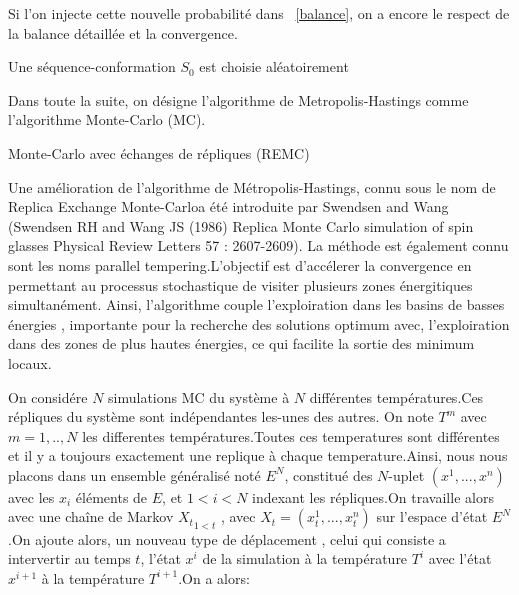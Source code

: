 Si l'on injecte cette nouvelle probabilité dans ~\ref{balance}, on a encore le respect de la balance détaillée et la convergence.


\begin{algorithm}
  Une séquence-conformation $S_0$ est choisie aléatoirement\;
  
\end{algorithm}


Dans toute la suite, on désigne l'algorithme de Metropolis-Hastings comme l'algorithme Monte-Carlo (MC).  


Monte-Carlo avec échanges de répliques (REMC)


Une amélioration de l'algorithme de Métropolis-Hastings, connu sous le nom de \og Replica Exchange Monte-Carlo\fg a été introduite par Swendsen and Wang (Swendsen RH and Wang JS (1986) Replica Monte Carlo simulation of spin glasses Physical Review Letters 57 : 2607-2609). La méthode est également connu sont les noms \og parallel tempering\fg.L'objectif est d'accélerer la convergence en permettant au processus stochastique de visiter plusieurs zones énergitiques simultanément. Ainsi, l'algorithme couple l'exploiration dans les basins de basses énergies , importante pour la recherche des solutions optimum avec, l'exploiration dans des zones de plus hautes énergies, ce qui facilite la sortie des minimum locaux.

On considére $N$ simulations MC du système à $N$ différentes températures.Ces répliques du système sont indépendantes les-unes des autres. On note $T^m$ avec $m=1,..,N$ les differentes températures.Toutes ces temperatures sont différentes et il y a toujours exactement une replique à chaque temperature.Ainsi, nous nous placons dans un ensemble généralisé noté $E^N$, constitué des $N$-uplet $(x^1,...,x^n)$ avec les $x_i$ éléments de $E$, et $1<i<N$  indexant les répliques.On travaille alors avec une chaîne de Markov ${X_t}_{1<t}$ , avec $X_t=(x^1_t,...,x^n_t)$ sur l'espace d'état $E^N$.On ajoute alors, un nouveau type de déplacement , celui qui consiste a intervertir au temps $t$, l'état $x^i$ de la simulation à la température $T^i$ avec l'état $x^{i+1}$ à la température $T^{i+1}$.On a alors:

